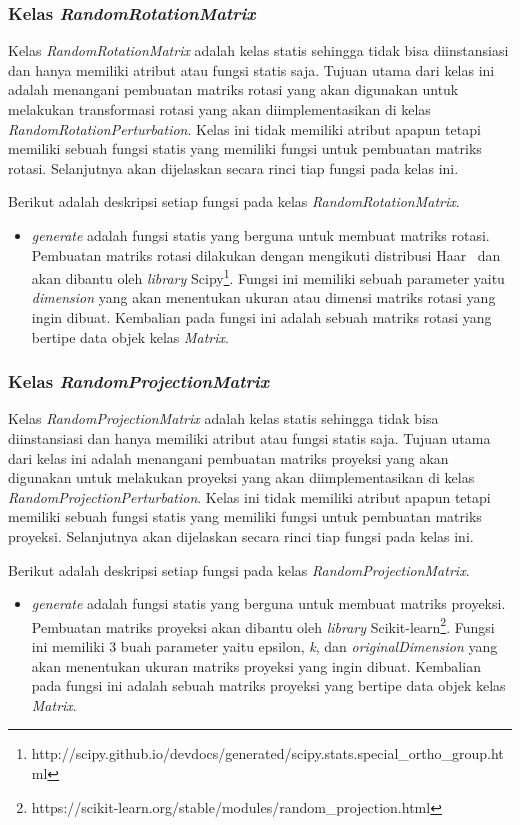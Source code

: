 \subsubsection{Kelas \textit{RandomRotationMatrix}}
\label{subsubsec:kelas-rrm}

Kelas \textit{RandomRotationMatrix} adalah kelas statis sehingga tidak bisa diinstansiasi dan hanya memiliki atribut atau fungsi statis saja. Tujuan utama dari kelas ini adalah menangani pembuatan matriks rotasi yang akan digunakan untuk melakukan transformasi rotasi yang akan diimplementasikan di kelas \textit{RandomRotationPerturbation}. Kelas ini tidak memiliki atribut apapun tetapi memiliki sebuah fungsi statis yang memiliki fungsi untuk pembuatan matriks rotasi. Selanjutnya akan dijelaskan secara rinci tiap fungsi pada kelas ini.

Berikut adalah deskripsi setiap fungsi pada kelas \textit{RandomRotationMatrix}.
\begin{itemize}
	\item \textit{generate} adalah fungsi statis yang berguna untuk membuat matriks rotasi. Pembuatan matriks rotasi dilakukan dengan mengikuti distribusi Haar~\cite{stewart:80:orthogonal} dan akan dibantu oleh \textit{library} Scipy\footnote{http://scipy.github.io/devdocs/generated/scipy.stats.special\_ortho\_group.html}. Fungsi ini memiliki sebuah parameter yaitu \textit{dimension} yang akan menentukan ukuran atau dimensi matriks rotasi yang ingin dibuat. Kembalian pada fungsi ini adalah sebuah matriks rotasi yang bertipe data objek kelas \textit{Matrix}.
\end{itemize}

\subsubsection{Kelas \textit{RandomProjectionMatrix}}
\label{subsubsec:kelas-rpm}

Kelas \textit{RandomProjectionMatrix} adalah kelas statis sehingga tidak bisa diinstansiasi dan hanya memiliki atribut atau fungsi statis saja. Tujuan utama dari kelas ini adalah menangani pembuatan matriks proyeksi yang akan digunakan untuk melakukan proyeksi yang akan diimplementasikan di kelas \textit{RandomProjectionPerturbation}. Kelas ini tidak memiliki atribut apapun tetapi memiliki sebuah fungsi statis yang memiliki fungsi untuk pembuatan matriks proyeksi. Selanjutnya akan dijelaskan secara rinci tiap fungsi pada kelas ini.

Berikut adalah deskripsi setiap fungsi pada kelas \textit{RandomProjectionMatrix}.
\begin{itemize}
	\item \textit{generate} adalah fungsi statis yang berguna untuk membuat matriks proyeksi. Pembuatan matriks proyeksi akan dibantu oleh \textit{library} Scikit-learn\footnote{https://scikit-learn.org/stable/modules/random\_projection.html}. Fungsi ini memiliki 3 buah parameter yaitu epsilon, \textit{k}, dan \textit{originalDimension} yang akan menentukan ukuran matriks proyeksi yang ingin dibuat. Kembalian pada fungsi ini adalah sebuah matriks proyeksi yang bertipe data objek kelas \textit{Matrix}.
\end{itemize}

